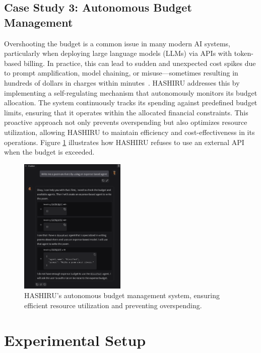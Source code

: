 \documentclass[conference]{IEEEtran}
\begin{document}
\subsection{Case Study 3: Autonomous Budget Management}
\label{sec:casestudy3_budget}
Overshooting the budget is a common issue in many modern AI systems, particularly when deploying large language models (LLMs) via APIs with token-based billing.
In practice, this can lead to sudden and unexpected cost spikes due to prompt amplification, model chaining, or misuse—sometimes resulting in hundreds of dollars in charges within minutes~\cite{gemini_reddit,openai_sos,openai_costs}.
HASHIRU addresses this by implementing a self-regulating mechanism that autonomously monitors its budget allocation.
The system continuously tracks its spending against predefined budget limits, ensuring that it operates within the allocated financial constraints.
This proactive approach not only prevents overspending but also optimizes resource utilization, allowing HASHIRU to maintain efficiency and cost-effectiveness in its operations.
Figure \ref{fig:budget_management} illustrates how HASHIRU refuses to use an external API when the budget is exceeded.

\begin{figure}[h]
    \centering
    \includegraphics[width=0.45\textwidth]{budget2.png}
    \caption{HASHIRU's autonomous budget management system, ensuring efficient resource utilization and preventing overspending.}
    \label{fig:budget_management}
\end{figure}

\section{Experimental Setup}
\label{sec:experiments}
\end{document}
